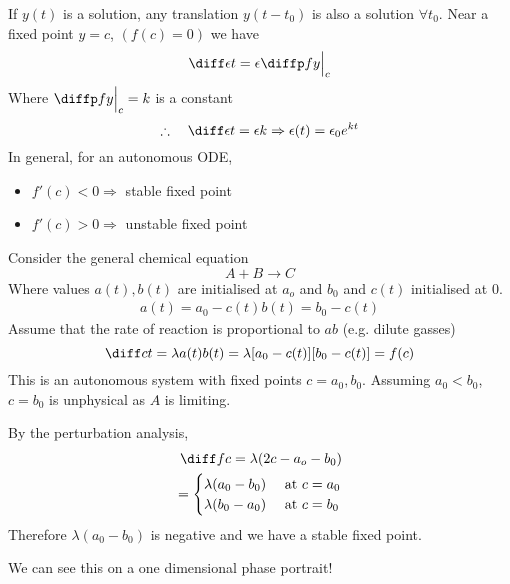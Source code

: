 \documentclass{article}
\begin{document}
If $y(t)$ is a solution, any translation $y(t - t_0)$ is also a solution $\forall t_0$.
Near a fixed point $y = c$, $(f(c) = 0)$ we have
\[
    \diff \epsilon t = \epsilon \diffp fy \eval_{c}{}
\]
Where $\diffp fy \eval_{c}{} = k$ is a constant
\[
    \therefore \quad \diff \epsilon t = \epsilon k \Rightarrow \epsilon(t) = \epsilon_0 e^{kt}
\]
In general, for an autonomous ODE, 
\begin{itemize}
    \item $f'(c) < 0 \Rightarrow$ stable fixed point
    \item $f'(c) > 0 \Rightarrow$ unstable fixed point
\end{itemize}

\begin{eg}
    Consider the general chemical equation
    \[
        A + B \longrightarrow C
    \]
    Where values $a(t), b(t)$ are initialised at $a_o$ and $b_0$ and $c(t)$ initialised at $0$.
    \begin{align*}
        a(t) = a_0 - c(t)
        b(t) = b_0 - c(t)
    \end{align*}
    Assume that the rate of reaction is proportional to $ab$ (e.g. dilute gasses)
    \[
        \diff ct = \lambda a(t)b(t) = \lambda [a_0 - c(t)][b_0 - c(t)] = f(c)
    \]
    This is an autonomous system with fixed points $c = a_0, b_0$.
    Assuming $a_0 < b_0$, $c = b_0$ is unphysical as $A$ is limiting.

    By the perturbation analysis,
    \begin{align*}
        \diff fc = \lambda(2c - a_o - b_0) \\
        = \begin{cases}
            \lambda(a_0 - b_0) & \text{ at } c = a_0 \\
            \lambda(b_0 - a_0) & \text{ at } c = b_0
        \end{cases}
    \end{align*}
    Therefore $\lambda(a_0 - b_0)$ is negative and we have a stable fixed point.

    We can see this on a one dimensional phase portrait!
\end{eg}

\end{document}

